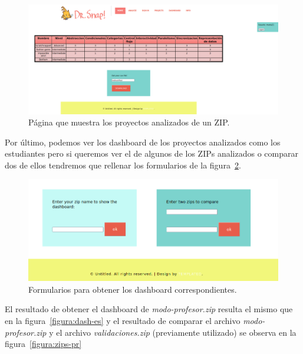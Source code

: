 \documentclass[a4paper, 12pt]{book}
\begin{document}
\begin{figure}[h]
            \centering
           \includegraphics[scale=0.35]{img/resultado-zip.png}
            \caption{Página que muestra los proyectos analizados de un ZIP.}
             \label{figura:zip-pr}
        \end{figure}

Por último, podemos ver los dashboard de los proyectos analizados como los estudiantes pero si queremos ver el de algunos de los ZIPs analizados o comparar dos de ellos tendremos que rellenar los formularios de la figura~\ref{figura:form-pr}.

\begin{figure}[h]
            \centering
           \includegraphics[scale=0.4]{img/form-zip.png}
            \caption{Formularios para obtener los dashboard correspondientes.}
             \label{figura:form-pr}
        \end{figure}
        
El resultado de obtener el dashboard de \textit{modo-profesor.zip} resulta el mismo que en la figura~\ref{figura:dash-es} y el resultado de comparar el archivo \textit{modo-profesor.zip} y el archivo \textit{validaciones.zip} (previamente utilizado) se observa en la figura~\ref{figura:zips-pr}
\end{document}
